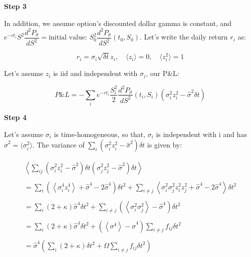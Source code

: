 \documentclass[a4]{article}
\begin{document}
\bigbreak
\noindent \textbf{Step 3}\par 
\bigbreak 
In addition, we assume option's discounted dollar gamma is constant, and $e^{-rt_{i}}S^{2}\dfrac{d^{2}P_{\hat{\sigma}}}{dS^{2}}=\text{initial value: } S_{0}^{2}\dfrac{d^{2}P_{\hat{\sigma}}}{dS^{2}}(t_{0},S_{0})$. Let's write the daily return $r_{i}$ as:\par 
\begin{equation}
r_{i} =\sigma_{i}\sqrt{\delta t}z_{i},\quad \langle z_{i}\rangle =0,\quad \langle z^{2}_{i}\rangle =1
\end{equation}\par 
\bigbreak 
\noindent Let's assume $z_{i}$ is iid and independent with $\sigma_{i}$, our P\&L:\par 
\begin{equation}
P\&L = -\sum_{i}e^{-rt_{i}}\dfrac{S_{i}^{2}}{2}\dfrac{d^{2}P_{\hat{\sigma}}}{dS^{2}}(t_{i},S_{i})(\sigma_{i}^{2}z_{i}^{2}-\hat{\sigma}^{2}\delta t)
\end{equation}\par 
\bigbreak 
\noindent \textbf{Step 4}\par 
Let's assume $\sigma_{i}$ is time-homogeneous, so that, $\sigma_{i}$ is independent with i and has $\hat{\sigma}^{2}=\langle \sigma_{i}^{2}\rangle$. The variance of $\sum_{i}(\sigma_{i}^{2}z_{i}^{2}-\hat{\sigma}^{2})\delta t$ is given by:\par 
\begin{equation}
\begin{array}{l}
\left\langle\sum_{i j}\left(\sigma_{i}^{2} z_{i}^{2}-\widehat{\sigma}^{2}\right) \delta t\left(\sigma_{j}^{2} z_{j}^{2}-\widehat{\sigma}^{2}\right) \delta t\right\rangle \\
\\
=\sum_{i}\left(\left\langle\sigma_{i}^{4} z_{i}^{4}\right\rangle+\widehat{\sigma}^{4}-2 \widehat{\sigma}^{4}\right) \delta t^{2}+\sum_{i \neq j}\left\langle\sigma_{i}^{2} \sigma_{j}^{2} z_{i}^{2} z_{j}^{2}+\widehat{\sigma}^{4}-2 \widehat{\sigma}^{4}\right\rangle \delta t^{2} \\
\\
=\sum_{i}(2+\kappa) \widehat{\sigma}^{4} \delta t^{2}+\sum_{i \neq j}\left(\left\langle\sigma_{i}^{2} \sigma_{j}^{2}\right\rangle-\widehat{\sigma}^{4}\right) \delta t^{2} \\
\\
=\sum_{i}(2+\kappa) \widehat{\sigma}^{4} \delta t^{2}+\left(\left\langle\sigma^{4}\right\rangle-\widehat{\sigma}^{4}\right) \sum_{i \neq j} f_{i j} \delta t^{2} \\
\\
=\widehat{\sigma}^{4}\left(\sum_{i}(2+\kappa) \delta t^{2}+\Omega \sum_{i \neq j} f_{i j} \delta t^{2}\right)
\end{array}
\end{equation}\par 
\end{document}
